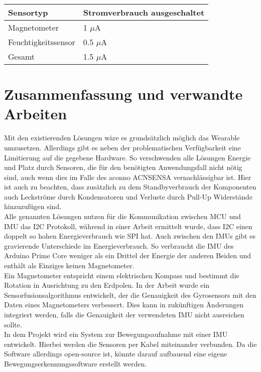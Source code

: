 \begin{minipage}{\linewidth}
	\label{tab:cmp_arduino_primo}
	\begin{tabularx}{\linewidth}{X|X}
		Sensortyp & Stromverbrauch ausgeschaltet\\
		\hline
    Magnetometer & 1 $\mu$A \cite{datasheet_lis3mdl}\\
    Feuchtigkeitssensor & 0.5 $\mu$A \cite{datasheet_hts221}\\
    \hline
    Gesamt & 1.5 $\mu$A\\
	\end{tabularx}
\end{minipage}

\section{Zusammenfassung und verwandte Arbeiten}
Mit den existierenden Lösungen wäre es grundsätzlich möglich das Wearable umzusetzen.
Allerdings gibt es neben der problematischen Verfügbarkeit eine Limitierung auf die gegebene Hardware.
So verschwenden alle Lösungen Energie und Platz durch Sensoren, die für den benötigten Anwendungsfall nicht nötig sind, auch wenn dies im Falle des aconno ACNSENSA vernachlässigbar ist.
Hier ist auch zu beachten, dass zusätzlich zu dem Standbyverbrauch der Komponenten auch Leckströme durch Kondensatoren und Verluste durch Pull-Up Widerstände hinzuzufügen sind.\\
Alle genannten Lösungen nutzen für die Kommunikation zwischen MCU und IMU das I2C Protokoll, während in einer Arbeit \cite{comparison_i2c_spi} ermittelt wurde, dass I2C einen doppelt so hohen Energieverbrauch wie SPI hat.
Auch zwischen den IMUs gibt es gravierende Unterschiede im Energieverbrauch.
So verbraucht die IMU des Arduino Prime Core weniger als ein Drittel der Energie der anderen Beiden und enthält als Einziges keinen Magnetometer.\\
Ein Magnetometer entspricht einem elektrischen Kompass und bestimmt die Rotation in Ausrichtung zu den Erdpolen.
In der Arbeit \cite{sensor_fusion} wurde ein Sensorfusionsalgorithmus entwickelt, der die Genauigkeit des Gyrosensors mit den Daten eines Magnetometers verbessert.
Dies kann in zukünftigen Änderungen integriert werden, falls die Genauigkeit der verwendeten IMU nicht ausreichen sollte.\\
In dem Projekt \cite{project_chordata} wird ein System zur Bewegungsaufnahme mit einer IMU entwickelt.
Hierbei werden die Sensoren per Kabel miteinander verbunden.
Da die Software allerdings open-source ist, könnte darauf aufbauend eine eigene Bewegungserkennungssoftware erstellt werden.
